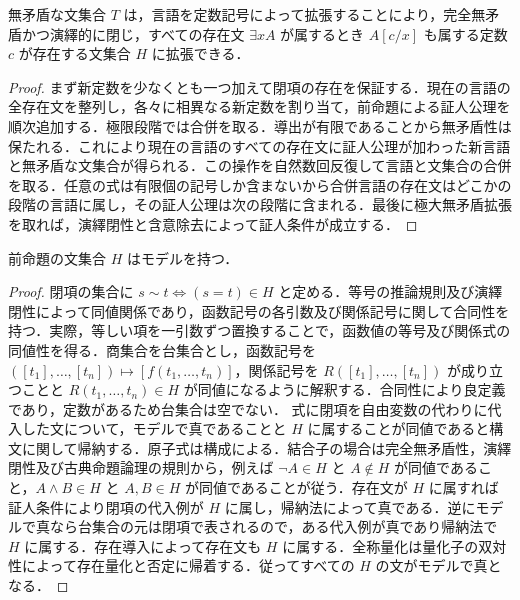 \begin{prop}[証人を備えた無矛盾拡張]
無矛盾な文集合 $T$ は，言語を定数記号によって拡張することにより，完全無矛盾かつ演繹的に閉じ，すべての存在文 $\exists x A$ が属するとき $A[c/x]$ も属する定数 $c$ が存在する文集合 $H$ に拡張できる．
\end{prop}
\begin{proof}
まず新定数を少なくとも一つ加えて閉項の存在を保証する．現在の言語の全存在文を整列し，各々に相異なる新定数を割り当て，前命題による証人公理を順次追加する．極限段階では合併を取る．導出が有限であることから無矛盾性は保たれる．これにより現在の言語のすべての存在文に証人公理が加わった新言語と無矛盾な文集合が得られる．この操作を自然数回反復して言語と文集合の合併を取る．任意の式は有限個の記号しか含まないから合併言語の存在文はどこかの段階の言語に属し，その証人公理は次の段階に含まれる．最後に極大無矛盾拡張を取れば，演繹閉性と含意除去によって証人条件が成立する．
\end{proof}
\begin{prop}[項モデル]
前命題の文集合 $H$ はモデルを持つ．
\end{prop}
\begin{proof}
閉項の集合に $s\sim t\Leftrightarrow(s=t)\in H$ と定める．等号の推論規則及び演繹閉性によって同値関係であり，函数記号の各引数及び関係記号に関して合同性を持つ．実際，等しい項を一引数ずつ置換することで，函数値の等号及び関係式の同値性を得る．商集合を台集合とし，函数記号を $([t_1],\ldots,[t_n])\mapsto[f(t_1,\ldots,t_n)]$，関係記号を $R([t_1],\ldots,[t_n])$ が成り立つことと $R(t_1,\ldots,t_n)\in H$ が同値になるように解釈する．合同性により良定義であり，定数があるため台集合は空でない．
式に閉項を自由変数の代わりに代入した文について，モデルで真であることと $H$ に属することが同値であると構文に関して帰納する．原子式は構成による．結合子の場合は完全無矛盾性，演繹閉性及び古典命題論理の規則から，例えば $\neg A\in H$ と $A\notin H$ が同値であること，$A\land B\in H$ と $A,B\in H$ が同値であることが従う．存在文が $H$ に属すれば証人条件により閉項の代入例が $H$ に属し，帰納法によって真である．逆にモデルで真なら台集合の元は閉項で表されるので，ある代入例が真であり帰納法で $H$ に属する．存在導入によって存在文も $H$ に属する．全称量化は量化子の双対性によって存在量化と否定に帰着する．従ってすべての $H$ の文がモデルで真となる．
\end{proof}

